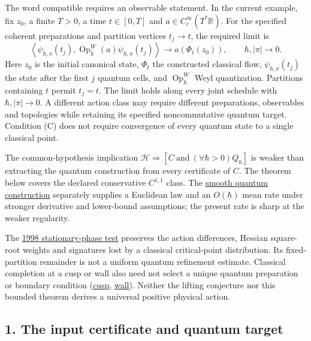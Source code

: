 \documentclass[11pt,a4paper]{article}
\begin{document}
The word compatible requires an observable statement. In the current
example, fix \(z_0\), a finite \(T>0\), a time \(t\in[0,T]\) and
\(a\in C_c^\infty(T^*\mathbb R)\). For the specified coherent
preparations and partition vertices \(t_j\to t\), the required limit is
\[
 \left\langle\psi_{\hbar,\pi}(t_j),
       \operatorname{Op}_\hbar^W(a)\psi_{\hbar,\pi}(t_j)\right\rangle
 \longrightarrow a(\Phi_t(z_0)),
 \qquad \hbar,|\pi|\longrightarrow0. \tag{C}
\] Here \(z_0\) is the initial canonical state, \(\Phi_t\) the
constructed classical flow, \(\psi_{\hbar,\pi}(t_j)\) the state after
the first \(j\) quantum cells, and \(\operatorname{Op}_\hbar^W\) Weyl
quantization. Partitions containing \(t\) permit \(t_j=t\). The limit
holds along every joint schedule with \(\hbar,|\pi|\to0\). A different
action class may require different preparations, observables and
topologies while retaining its specified noncommutative quantum target.
Condition (C) does not require convergence of every quantum state to a
single classical point.

The common-hypothesis implication
\(\mathcal H\Rightarrow[C\ \mathrm{and}\ (\forall\hbar>0)Q_\hbar]\) is
weaker than extracting the quantum construction from every certificate
of \(C\). The theorem below covers the declared conservative \(C^{1,1}\)
class. The \href{quantum-blocks-construct-newton.md}{smooth quantum
construction} separately supplies a Euclidean law and an \(O(\hbar)\)
mean rate under stronger derivative and lower-bound assumptions; the
present rate is sharp at the weaker regularity.

The \href{rivero-1998-conjecture-central-forces.md}{1998
stationary-phase test} preserves the action differences, Hessian
square-root weights and signatures lost by a classical critical-point
distribution. Its fixed-partition remainder is not a uniform quantum
refinement estimate. Classical completion at a cusp or wall also need
not select a unique quantum preparation or boundary condition
(\href{cusp-quantum-preparation-selection.md}{cusp},
\href{dirichlet-wall-impulse.md}{wall}). Neither the lifting conjecture
nor this bounded theorem derives a universal positive physical action.

\subsection{1. The input certificate and quantum
target}\label{the-input-certificate-and-quantum-target}
\end{document}

